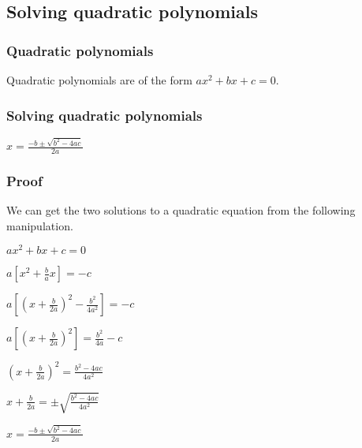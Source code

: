 
\subsection{Solving quadratic polynomials}

\subsubsection{Quadratic polynomials}

Quadratic polynomials are of the form \(ax^2+bx+c=0\).

\subsubsection{Solving quadratic polynomials}

$x=\frac{-b\pm \sqrt {b^2-4ac}}{2a}$

\subsubsection{Proof}

We can get the two solutions to a quadratic equation from the following manipulation.

$ax^2+bx+c=0$

$a[x^2+\frac{b}{a}x]=-c$

$a[(x+\frac{b}{2a})^2-\frac{b^2}{4a^2}]=-c$

$a[(x+\frac{b}{2a})^2]=\frac{b^2}{4a}-c$

$(x+\frac{b}{2a})^2=\frac{b^2-4ac}{4a^2}$

$x+\frac{b}{2a}=\pm \sqrt {\frac{b^2-4ac}{4a^2}}$

$x=\frac{-b\pm \sqrt {b^2-4ac}}{2a}$

